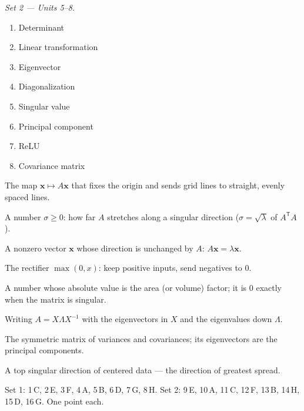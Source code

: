 \documentclass[10pt]{article}
\newcommand{\xx}{\mathbf{x}}
\newcommand{\T}{\mathsf{T}}
\begin{document}
\vspace{6pt}
\noindent\textit{Set 2 --- Units 5--8.}\\[2pt]
\noindent
\begin{minipage}[t]{0.40\textwidth}
\begin{enumerate}[leftmargin=2.2em, itemsep=5pt, label=\arabic*., start=9]
  \item Determinant 
  \item Linear transformation 
  \item Eigenvector 
  \item Diagonalization 
  \item Singular value 
  \item Principal component 
  \item ReLU 
  \item Covariance matrix 
\end{enumerate}
\end{minipage}%
\hfill
\begin{minipage}[t]{0.57\textwidth}
\small
\begin{description}[leftmargin=1.4em, itemsep=2pt]
  \item[(A)] The map $\xx\mapsto A\xx$ that fixes the origin and sends grid lines to straight, evenly spaced lines.
  \item[(B)] A number $\sigma\ge0$: how far $A$ stretches along a singular direction ($\sigma=\sqrt\lambda$ of $A^\T A$).
  \item[(C)] A nonzero vector $\xx$ whose direction is unchanged by $A$: $A\xx=\lambda\xx$.
  \item[(D)] The rectifier $\max(0,x)$: keep positive inputs, send negatives to $0$.
  \item[(E)] A number whose absolute value is the area (or volume) factor; it is $0$ exactly when the matrix is singular.
  \item[(F)] Writing $A=X\Lambda X^{-1}$ with the eigenvectors in $X$ and the eigenvalues down $\Lambda$.
  \item[(G)] The symmetric matrix of variances and covariances; its eigenvectors are the principal components.
  \item[(H)] A top singular direction of centered data --- the direction of greatest spread.
\end{description}
\end{minipage}

\begin{teachernote}
Set 1: 1\,C, 2\,E, 3\,F, 4\,A, 5\,B, 6\,D, 7\,G, 8\,H. \quad
Set 2: 9\,E, 10\,A, 11\,C, 12\,F, 13\,B, 14\,H, 15\,D, 16\,G. \quad One point each.
\end{teachernote}
\end{document}
